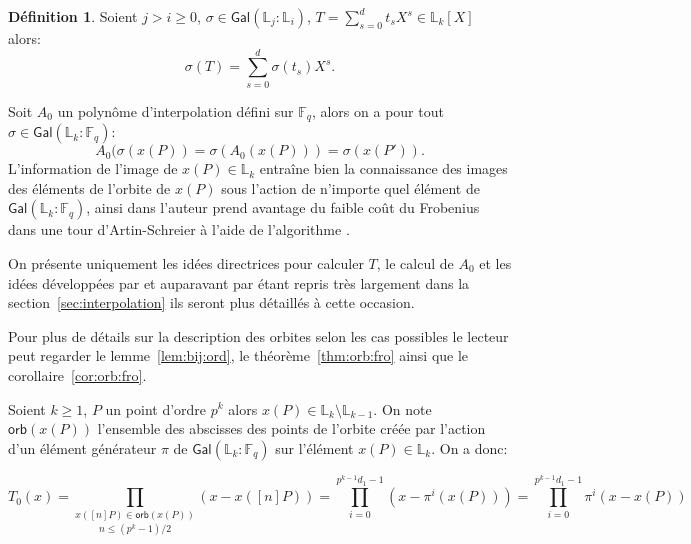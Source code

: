 \documentclass[10pt,a4paper]{book}
\theoremstyle{plain}
\theoremstyle{definition}
\theoremstyle{definition}
\theoremstyle{definition}
\theoremstyle{definition}
\newtheorem{defi}[thm]{Définition}
\theoremstyle{remark}
\theoremstyle{remark}
\theoremstyle{definition}
\begin{document}
\begin{defi}
Soient $j > i \geqslant 0$, $\sigma \in \mathsf{Gal}(\mathbb{L}_j:\mathbb{L}_i)$, $T=\sum_{s=0}^{d}t_sX^s \in \mathbb{L}_k[X]$ alors:
\[
\sigma(T)=\sum_{s=0}^{d}\sigma(t_s)X^s.
\]   
\end{defi}

Soit $A_0$ un polynôme d'interpolation défini sur $\mathbb{F}_q$, alors on a pour tout $\sigma \in \mathsf{Gal}(\mathbb{L}_k:\mathbb{F}_q)$:
\begin{equation*}
A_0(\sigma(x(P))=\sigma(A_0(x(P)))=\sigma(x(P')).
\end{equation*}
L'information de l'image de $x(P) \in \mathbb{L}_k$ entraîne bien la connaissance des images des éléments de l'orbite de $x(P)$ sous l'action de n'importe quel élément de $\mathsf{Gal}(\mathbb{L}_k:\mathbb{F}_q)$, ainsi dans \cite{DeFeo11} l'auteur prend avantage du faible coût du Frobenius dans une tour d'Artin-Schreier à l'aide de l'algorithme \cite[Iter Frobenius,Theorem 17 et 18]{DeFeo-Shost'12}.%



On présente uniquement les idées directrices pour calculer $T$, le calcul de 
$A_0$ et les idées développées par \cite{DeFeo11} et auparavant par 
\cite{EngeMorain03} étant repris très largement dans la 
section~\ref{sec:interpolation} ils seront plus détaillés à cette occasion.


Pour plus de détails sur la description des orbites selon les cas 
possibles le lecteur peut regarder le  lemme~\ref{lem:bij:ord}, le 
théorème~\ref{thm:orb:fro} ainsi que le corollaire~\ref{cor:orb:fro}.

Soient $k \geqslant 1$, $P$ un point d'ordre $p^k$ alors $x(P) \in \mathbb{L}_{k} \setminus \mathbb{L}_{k-1}$. On note $\mathsf{orb}(x(P))$ l'ensemble des abscisses des points de l'orbite créée par l'action d'un élément générateur $\pi$ de $\mathsf{Gal}(\mathbb{L}_k:\mathbb{F}_{q})$ sur l'élément $x(P) \in \mathbb{L}_k$. On a donc: 

\begin{equation*}
T_{0}(x)= \overset{}{\underset{n \leqslant (p^k-1)/2}{\underset{x([n]P) \in \mathsf{orb}(x(P)) }{\prod }}}(x-x([n]P))=\prod_{i=0}^{p^{k-1}d_1-1}(x-\pi^i(x(P)))=\prod_{i=0}^{{p^{k-1}d_1-1}}\pi^i(x-x(P))
\end{equation*}
\end{document}
